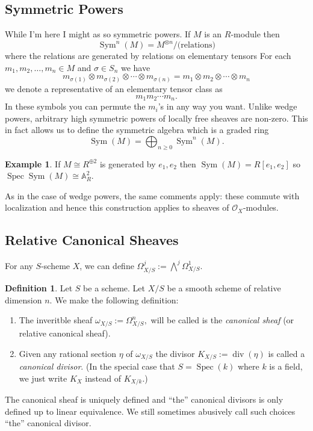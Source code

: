 \documentclass[12pt]{article}
\numberwithin{equation}{section}
\theoremstyle{definition}
\newtheorem{definition}[theorem]{Definition}
\newtheorem{example}[theorem]{Example}
\theoremstyle{remark}
\newcommand{\Ocal}{\mathcal{O}}
\renewcommand{\AA}{\mathbb{A}}
\newcommand{\Spec}{\operatorname{Spec}}
\renewcommand{\div}{\operatorname{div}}
\newcommand{\Sym}{\operatorname{Sym}}
\begin{document}
\subsection{Symmetric Powers}
While I'm here I might as so symmetric powers. 
If $M$ is an $R$-module then 
 $$ \Sym^n(M) = M^{\otimes n}/\mbox{(relations)} $$
where the relations are generated by relations on elementary tensors 
For each $m_1,m_2,\ldots,m_n\in M$ and $\sigma\in S_n$ we have 
$$m_{\sigma(1)} \otimes m_{\sigma(2)} \otimes \cdots \otimes m_{\sigma(n)} = m_1\otimes m_2 \otimes \cdots \otimes m_n$$
we denote a representative of an elementary tensor class as 
 $$m_1m_2\cdots m_n. $$
 In these symbols you can permute the $m_i$'s in any way you want. 
 Unlike wedge powers, arbitrary high symmetric powers of locally free sheaves are non-zero. 
 This in fact allows us to define the symmetric algebra which is a graded ring 
  $$\Sym(M) = \bigoplus_{n\geq 0} \Sym^n(M).$$
  
\begin{example}
	If $M \cong R^{\oplus 2}$ is generated by $e_1,e_2$ then $\Sym(M) = R[e_1,e_2]$ so $\Spec \Sym(M) \cong \AA^2_R$.
\end{example}
As in the case of wedge powers, the same comments apply: these commute with localization and hence this construction applies to sheaves of $\Ocal_X$-modules. 

\subsection{Relative Canonical Sheaves}
For any $S$-scheme $X$, we can define $\Omega^j_{X/S} := \bigwedge^j \Omega^1_{X/S}$. 

\begin{definition}
	Let $S$ be a scheme.
	Let $X/S$ be a smooth scheme of relative dimension $n$.
	We make the following definition:
	\begin{enumerate}
		\item The inveritble sheaf $\omega_{X/S}:= \Omega^n_{X/S},$ will be called is the \emph{canonical sheaf} (or relative canonical sheaf). 
		\item Given any rational section $\eta$ of $\omega_{X/S}$ the divisor $ K_{X/S} := \div(\eta)$ is called a \emph{canonical divisor}. 
		(In the special case that $S = \Spec(k)$ where $k$ is a field, we just write $K_X$ instead of $K_{X/k}$.)
	\end{enumerate}
\end{definition} 

The canonical sheaf is uniquely defined and ``the'' canonical divisors is only defined up to linear equivalence. 
We still sometimes abusively call such choices ``the'' canonical divisor.
\end{document}
